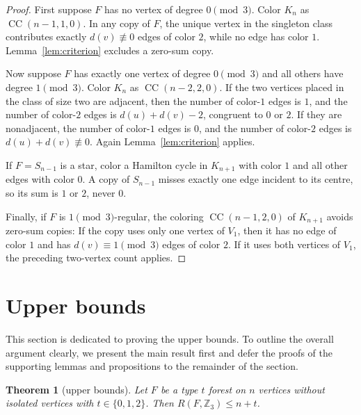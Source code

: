 \documentclass[11pt]{article}
\newtheorem{theorem}{Theorem}[section]
\newcommand{\Z}{\mathbb Z}
\newcommand{\CC}{\operatorname{CC}}
\begin{document}
\begin{proof}
First suppose $F$ has no vertex of degree $0\pmod3$.  Color $K_n$ as $\CC(n-1,1,0)$.  In any copy of $F$, the unique vertex in the singleton class contributes exactly $d(v)\not\equiv0$ edges of color $2$, while no edge has color $1$.  Lemma~\ref{lem:criterion} excludes a zero-sum copy.

Now suppose $F$ has exactly one vertex of degree $0\pmod3$ and all others have degree $1\pmod3$.  Color $K_n$ as $\CC(n-2,2,0)$.  If the two vertices placed in the class of size two are adjacent, then the number of color-$1$ edges is $1$, and the number of color-$2$ edges is $d(u)+d(v)-2$, congruent to $0$ or $2$.  If they are nonadjacent, the number of color-$1$ edges is $0$, and the number of color-$2$ edges is $d(u)+d(v)\not\equiv0$.  Again Lemma~\ref{lem:criterion} applies.

If $F=S_{n-1}$ is a star, color a Hamilton cycle in $K_{n+1}$ with color $1$ and all other edges with color $0$.  A copy of $S_{n-1}$ misses exactly one edge incident to its centre, so its sum is $1$ or $2$, never $0$.

Finally, if $F$ is $1\pmod3$-regular, the coloring $\CC(n-1,2,0)$ of $K_{n+1}$ avoids zero-sum copies: If the copy uses only one vertex of $V_1$, then it has no edge of
color $1$ and has $d(v)\equiv1\pmod3$ edges of color $2$.
If it uses both vertices of $V_1$, the preceding two-vertex count applies. 
\end{proof}

\section{Upper bounds}\label{sec:upper}

This section is dedicated to proving the upper bounds. To outline the overall argument clearly, we present the main result first and defer the proofs of the supporting lemmas and propositions to the remainder of the section.

\begin{theorem}[upper bounds]\label{thm:upper}
Let $F$ be a type $t$ forest on $n$ vertices without isolated vertices with $t\in\{0,1,2\}$.  Then $R(F,\Z_3)\le n+t$.
\end{theorem}
\end{document}
